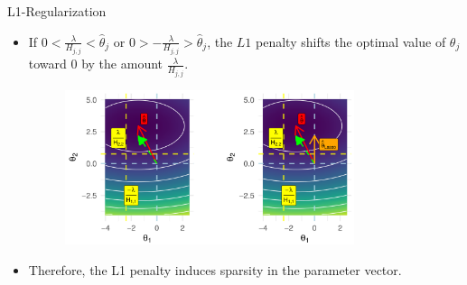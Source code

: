 \begin{vbframe} {L1-Regularization}
\begin{itemize}
  \end{itemize}
\framebreak
  \begin{itemize}
  
    \item If $0 < \frac{\lambda}{H_{j,j}} < \hat{\theta}_j$ or  $0 > -\frac{\lambda}{H_{j,j}} > \hat{\theta}_j$, the $L1$ penalty shifts the optimal value of $\theta_j$ toward 0 by the amount $\frac{\lambda}{H_{j,j}}$.

\vfill


\begin{figure}
\includegraphics[width=0.8\textwidth]{figure_man/L1-regul02.png}\\
\end{figure}

    \item Therefore, the L1 penalty induces sparsity in the parameter vector.
  \end{itemize}

  
\end{vbframe}

\endlecture

